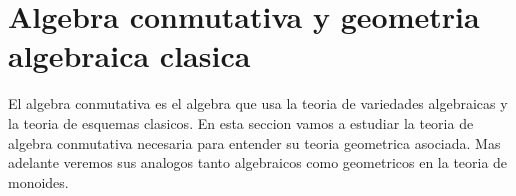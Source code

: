 \section{Algebra conmutativa y geometria algebraica clasica}
\label{sec:algebra-conmutativa-y-geometria-algebraica-clasica}
El algebra conmutativa es el algebra que usa la teoria de variedades algebraicas
y la teoria de esquemas clasicos. En esta seccion vamos a estudiar la teoria de
algebra conmutativa necesaria para entender su teoria geometrica asociada.
Mas adelante veremos sus analogos tanto algebraicos como geometricos en la teoria
de monoides.
